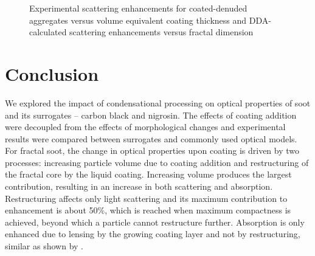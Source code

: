 \documentclass[12pt,authoryear]{elsarticle}
\begin{document}
\begin{figure}[htp]
    \centering

    \caption{Experimental scattering enhancements for coated-denuded aggregates versus volume equivalent coating thickness and DDA-calculated scattering enhancements versus fractal dimension}
    \label{fig:scat_denuded}
\end{figure}


\section{Conclusion}

We explored the impact of condensational processing on optical properties of soot and its surrogates -- carbon black and nigrosin. The effects of coating addition were decoupled from the effects of morphological changes and experimental results were compared between surrogates and commonly used optical models.
For fractal soot, the change in optical properties upon coating is driven by two processes: increasing particle volume due to coating addition and restructuring of the fractal core by the liquid coating. Increasing volume produces the largest contribution, resulting in an increase in both scattering and absorption. Restructuring affects only light scattering and its maximum contribution to enhancement is about 50\%, which is reached when maximum compactness is achieved, beyond which a particle cannot restructure further. Absorption is only enhanced due to lensing by the growing coating layer and not by restructuring, similar as shown by \citet{RN67}. 
\end{document}
